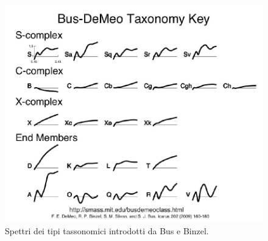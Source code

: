\documentclass[a4paper,11pt,openright]{book}
\begin{document}
\begin{figure}[!ht]
    \centering
    \includegraphics[scale=0.44]{figure/spettro_bus.jpg}
    \caption[Spettri dei tipi tassonomici introdotti da Bus e Binzel.]{Spettri dei tipi tassonomici introdotti da Bus e Binzel. \citep{demeo_extension_2009}}
    \label{spettro_bus}
\end{figure}
\end{document}
